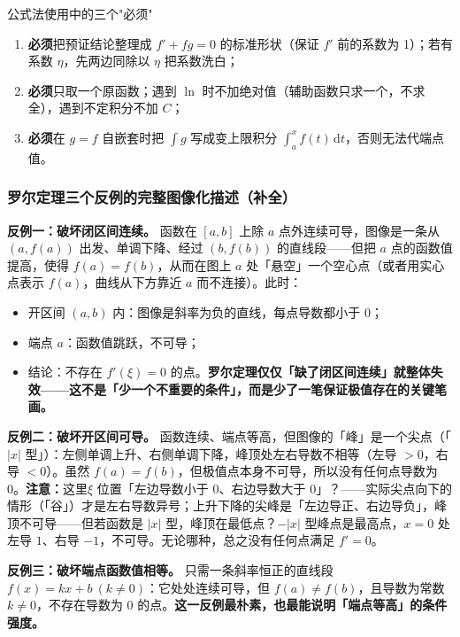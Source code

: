 \documentclass[a4paper]{article}
\begin{document}
\begin{warningbox}{公式法使用中的三个"必须"}
\begin{enumerate}
\item \textbf{必须}把预证结论整理成 $f'+fg=0$ 的标准形状（保证 $f'$ 前的系数为 1）；若有系数 $\eta$，先两边同除以 $\eta$ 把系数洗白；
\item \textbf{必须}只取一个原函数；遇到 $\ln$ 时不加绝对值（辅助函数只求一个，不求全），遇到不定积分不加 $C$；
\item \textbf{必须}在 $g=f$ 自嵌套时把 $\int g$ 写成变上限积分 $\int_a^x f(t)\,\mathrm{d}t$，否则无法代端点值。
\end{enumerate}
\end{warningbox}


\subsubsection{罗尔定理三个反例的完整图像化描述（补全）}

\textbf{反例一：破坏闭区间连续。} 函数在 $[a,b]$ 上除 $a$ 点外连续可导，图像是一条从 $(a,f(a))$ 出发、单调下降、经过 $(b,f(b))$ 的直线段——但把 $a$ 点的函数值提高，使得 $f(a)=f(b)$，从而在图上 $a$ 处「悬空」一个空心点（或者用实心点表示 $f(a)$，曲线从下方靠近 $a$ 而不连接）。此时：
\begin{itemize}
\item 开区间 $(a,b)$ 内：图像是斜率为负的直线，每点导数都小于 0；
\item 端点 $a$：函数值跳跃，不可导；
\item 结论：不存在 $f'(\xi)=0$ 的点。\textbf{罗尔定理仅仅「缺了闭区间连续」就整体失效——这不是「少一个不重要的条件」，而是少了一笔保证极值存在的关键笔画。}
\end{itemize}

\textbf{反例二：破坏开区间可导。} 函数连续、端点等高，但图像的「峰」是一个尖点（「$|x|$ 型」）：左侧单调上升、右侧单调下降，峰顶处左右导数不相等（左导 $>0$，右导 $<0$）。虽然 $f(a)=f(b)$，但极值点本身不可导，所以没有任何点导数为 0。\textbf{注意：}这里$\xi$ 位置「左边导数小于 0、右边导数大于 0」？——实际尖点向下的情形（「谷」）才是左右导数异号；上升下降的尖峰是「左边导正、右边导负」，峰顶不可导——但若函数是 $|x|$ 型，峰顶在最低点？$-|x|$ 型峰点是最高点，$x=0$ 处左导 $1$、右导 $-1$，不可导。无论哪种，总之没有任何点满足 $f'=0$。

\textbf{反例三：破坏端点函数值相等。} 只需一条斜率恒正的直线段 $f(x)=kx+b\ (k\neq0)$：它处处连续可导，但 $f(a)\neq f(b)$，且导数为常数 $k\neq0$，不存在导数为 0 的点。\textbf{这一反例最朴素，也最能说明「端点等高」的条件强度。}
\end{document}
